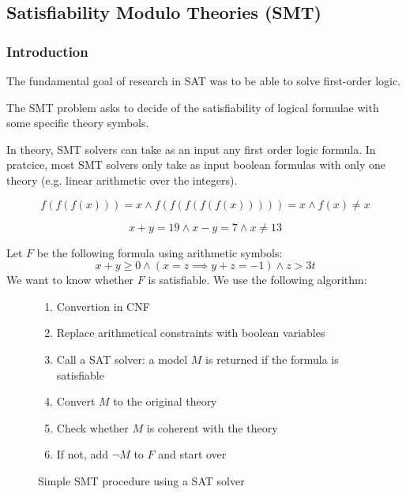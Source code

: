 \documentclass[toc]{../cs-classes/cs-classes}
\begin{document}
\subsection{Satisfiability Modulo Theories (SMT)}
\subsubsection{Introduction}
The fundamental goal of research in SAT was to be able to solve first-order logic.

The SMT problem asks to decide of the satisfiability of logical formulae with some specific theory symbols. 

In theory, SMT solvers can take as an input any first order logic formula. In pratcice, most SMT solvers only take as input boolean formulas with only one theory (e.g. linear arithmetic over the integers).

\begin{example}
    \begin{equation*}
        f(f(f(x))) = x \land f(f(f(f(f(x))))) = x \land f(x) \neq x
    \end{equation*}

    \begin{equation*}
        x+y = 19 \land x-y=7 \land x\neq 13
    \end{equation*}
\end{example}

Let $F$ be the following formula using arithmetic symbols:
\begin{equation*}
    x+y\geq 0 \land (x=z \implies y+z=-1) \land z > 3t
\end{equation*}
We want to know whether $F$ is satisfiable.
We use the following algorithm:
\begin{figure}[!ht]
    \centering
    \begin{minipage}{0.77\textwidth}
    \begin{enumerate}
        \item Convertion in CNF
        \item Replace arithmetical constraints with boolean variables
        \item Call a SAT solver: a model $M$ is returned if the formula is satisfiable
        \item Convert $M$ to the original theory
        \item Check whether $M$ is coherent with the theory
        \item If not, add $\lnot M$ to $F$ and start over
    \end{enumerate}
    \end{minipage}
    \caption{Simple SMT procedure using a SAT solver}
\end{figure}
\end{document}
